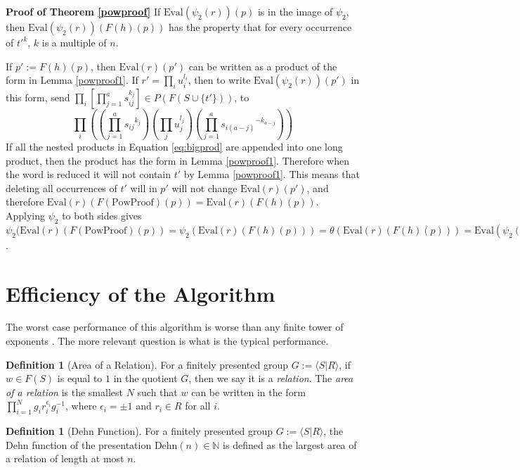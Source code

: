 \documentclass[12pt]{article} %
\theoremstyle{definition}
\theoremstyle{definition}
\theoremstyle{definition}
\theoremstyle{definition}
\theoremstyle{definition}
\newtheorem{defn}[theorem]{Definition}
\theoremstyle{definition}
\begin{document}
\textbf{Proof of Theorem \ref{powproof}} \newline
If $\text{Eval}(\psi_2(r))(p)$ is in the image of $\psi_2$,
then
$\text{Eval}(\psi_2(r))(F(h)(p))$ has the property
that for every occurrence of $t'^k$, $k$ is a multiple of $n$.

If $p' := F(h)(p)$,
then $\text{Eval}(r)(p')$ can be written as a product of the form in
Lemma \ref{powproof1}.
If $r' = \prod_i u_i^{l_i}$, then to write $\text{Eval}(\psi_2(r))(p')$ in this
form, send $\prod_i \left[\prod_{j = 1}^a s_{ij}^{k_j}\right]
\in P(F(S \cup \{t'\}))$, to
\begin{equation} \label{eq:bigprod}
  \prod_i \left(\left(\prod_{j = 1}^a {s_{ij}}^{k_j}\right) \left(\prod_j u_j^{l_j}\right)
  \left(\prod_{j = 1}^a {s_{i(a - j)}}^{-k_{a - j}}\right)\right)
\end{equation}
If all the nested products in Equation \ref{eq:bigprod} are appended into one long product,
then the product has the form in Lemma \ref{powproof1}. Therefore when the word is reduced
it will not contain $t'$ by Lemma \ref{powproof1}. This means that deleting all occurrences of
$t'$ will in $p'$ will not change $\text{Eval}(r)(p')$, and therefore
$\text{Eval}(r)(F(\text{PowProof})(p)) = \text{Eval}(r)(F(h)(p))$.
Applying $\psi_2$ to both sides gives
$\psi_2(\text{Eval}(r)(F(\text{PowProof})(p)) =
  \psi_2(\text{Eval}(r)(F(h)(p))) =
  \theta(\text{Eval}(r)(F(h)(p))) =
  \text{Eval}(\psi_2(r))(p)$.

\section{Efficiency of the Algorithm}

  The worst case performance of this algorithm is worse than any finite tower of exponents
  \cite{miasnikov2011word}. The more relevant question is what is the typical performance.

  \begin{defn}[Area of a Relation]
  For a finitely presented group $G := \langle S | R\rangle$, if $w \in F(S)$ is equal
  to $1$ in the quotient $G$, then we say it is a \textit{relation}.
  The \textit{area of a relation} is the smallest $N$ such that $w$ can be written
  in the form $\prod_{i=1}^N g_i r_i^{\epsilon_i} g_i^{-1}$, where $\epsilon_i = \pm 1$
  and $r_i \in R$ for all $i$.
  \end{defn}

  \begin{defn}[Dehn Function]
  For a finitely presented group $G := \langle S | R\rangle$, the Dehn function
  of the presentation $\text{Dehn}(n) \in \mathbb{N}$ is defined as the
  largest area of a relation of length at most $n$.
  \end{defn}
\end{document}
